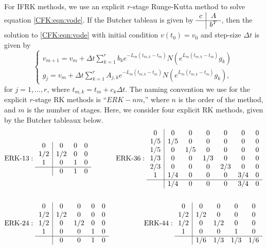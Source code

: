 \documentclass{csri19}
\begin{document}
For IFRK methods, we use an explicit $r$-stage Runge-Kutta method to solve 
equation \ref{CFK:eqn:vode}. If the Butcher tableau is given by 
$\begin{array}{c|c}
c & A \\ \hline & b^T \end{array}$, then the solution to \ref{CFK:eqn:vode} 
with initial condition $v(t_0) = v_0$ and step-size $\Delta t$ is given by
\[ \left\{\begin{array}{l} v_{m+1} = v_m + \Delta t\sum_{k=1}^r b_k 
                         e^{-L_m(t_{m,k}-t_m)}N(e^{L_m(t_{m,k}-t_m)}g_k) \\
          g_j = v_m + \Delta t \sum_{k=1}^r A_{j,k} e^{-L_m(t_{m,k} - t_m)} 
                      N(e^{L_m(t_{m,k}-t_m)}g_k), \end{array} \right. \]
for $j = 1,\dots,r$, where $t_{m,k} = t_m + c_k \Delta t$.
The naming convention we use for the explicit $r$-stage RK methods is ``$ERK
-nm$,'' where $n$ is the order of the method, and $m$ is the number of
stages. Here, we consider four explicit RK methods, given by the Butcher 
tableaux below.
\begin{align*}&\text{ERK-}13:
 \begin{array}{c|ccc}
0   & 0   & 0 & 0\\
1/2 & 1/2 & 0 & 0\\
1   & 0   & 1 & 0\\
\hline
    & 0   & 1 & 0
\end{array}
& \text{ERK-}36: 
\begin{array}{c|cccccc}
0   & 0   & 0   & 0   & 0   & 0   & 0\\
1/5 & 1/5 & 0   & 0   & 0   & 0   & 0\\
1/5 & 0   & 1/5 & 0   & 0   & 0   & 0\\
1/3 & 0   & 0   & 1/3 & 0   & 0   & 0\\
2/3 & 0   & 0   & 0   & 2/3 & 0   & 0\\
1   & 1/4 & 0   & 0   & 0   & 3/4 & 0\\
\hline
    & 1/4 & 0   & 0   & 0   & 3/4 & 0
\end{array}\\
\\
&\text{ERK-}24: 
\begin{array}{c|cccc}
0   & 0   & 0   & 0 & 0\\
1/2 & 1/2 & 0   & 0 & 0\\
1/2 & 0   & 1/2 & 0 & 0\\
1   & 0   & 0   & 1 & 0\\
\hline
    & 0   & 0   & 1 & 0
\end{array}
& \text{ERK-}44: 
\begin{array}{c|cccc}
0   & 0   & 0   & 0   & 0 \\
1/2 & 1/2 & 0   & 0   & 0 \\
1/2 & 0   & 1/2 & 0   & 0 \\
1   & 0   & 0   & 1   & 0 \\
\hline
    & 1/6 & 1/3 & 1/3 & 1/6
\end{array} 
\end{align*}
\end{document}
